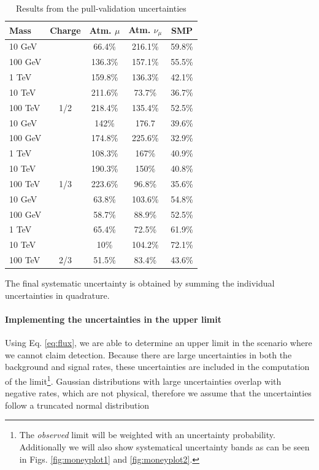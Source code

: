 \begin{table}[]
\centering
\caption{Results from the pull-validation uncertainties}
\label{tab:pvuncertainties}
\begin{tabular}{|
>{\columncolor[HTML]{F1A91E}}l |c|c|c|c|}
\hline
Mass & \cellcolor[HTML]{F1A91E}Charge & \cellcolor[HTML]{F1A91E}Atm. $\mu$ & \cellcolor[HTML]{F1A91E}Atm. $\nu_\mu$ & \cellcolor[HTML]{F1A91E}SMP \\ \hline
10 GeV &  & 66.4\% & 216.1\% & 59.8\% \\ \cline{3-5}
100 GeV &  & 136.3\% & 157.1\% & 55.5\% \\ \cline{3-5}
1 TeV &  & 159.8\% & 136.3\% & 42.1\% \\ \cline{3-5}
10 TeV &  & 211.6\% & 73.7\% & 36.7\% \\ \cline{3-5}
100 TeV & \multirow{-5}{*}{1/2} & 218.4\% & 135.4\% & 52.5\% \\ \hline
10 GeV & & 142\% & 176.7 & 39.6\% \\ \cline{3-5}
100 GeV & & 174.8\% & 225.6\% & 32.9\% \\ \cline{3-5}
1 TeV & & 108.3\% & 167\% & 40.9\% \\ \cline{3-5}
10 TeV & & 190.3\% & 150\% & 40.8\% \\\cline{3-5}
100 TeV & \multirow{-5}{*}{1/3} & 223.6\% & 96.8\% & 35.6\% \\ \hline
10 GeV & & 63.8\% & 103.6\% & 54.8\% \\ \cline{3-5}
100 GeV & & 58.7\% & 88.9\% & 52.5\% \\\cline{3-5}
1 TeV & & 65.4\% & 72.5\% & 61.9\% \\ \cline{3-5}
10 TeV & & 10\% & 104.2\% & 72.1\% \\ \cline{3-5}
100 TeV & \multirow{-5}{*}{2/3} & 51.5\% & 83.4\% & 43.6\% \\ \hline
\end{tabular}
\end{table}

\noindent The final systematic uncertainty is obtained by summing the individual uncertainties in quadrature.

\paragraph{Implementing the uncertainties in the upper limit}
Using Eq. \ref{eq:flux}, we are able to determine an upper limit in the scenario where we cannot claim detection. Because there are large uncertainties in both the background and signal rates, these uncertainties are included in the computation of the limit\footnote{The \textit{observed} limit will be weighted with an uncertainty probability. Additionally we will also show systematical uncertainty bands as can be seen in Figs. \ref{fig:moneyplot1} and \ref{fig:moneyplot2}.}. Gaussian distributions with large uncertainties overlap with negative rates, which are not physical, therefore we assume that the uncertainties follow a truncated normal distribution 

